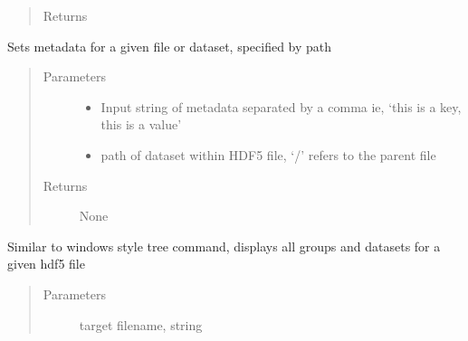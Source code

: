 \documentclass[letterpaper,10pt,english]{sphinxmanual}
\begin{document}
\begin{fulllineitems}
\begin{fulllineitems}
\begin{quote}
\begin{description}
\begin{itemize}
\end{itemize}

\item[{Returns}] \leavevmode
\sphinxAtStartPar


\end{description}\end{quote}

\end{fulllineitems}


\begin{fulllineitems}
\label{\detokenize{index:HDF5Browser.FileBrowser.__setMetadata}}
\sphinxAtStartPar
Sets metadata for a given file or dataset, specified by path
\begin{quote}\begin{description}
\item[{Parameters}] \leavevmode\begin{itemize}
\item {} 
\sphinxAtStartPar
{} \textendash{} Input string of metadata separated by a comma \sphinxhyphen{} ie, ‘this is a key, this is a value’

\item {} 
\sphinxAtStartPar
{} \textendash{} path of dataset within HDF5 file, ‘/’ refers to the parent file

\end{itemize}

\item[{Returns}] \leavevmode
\sphinxAtStartPar
None

\end{description}\end{quote}

\end{fulllineitems}


\begin{fulllineitems}
\label{\detokenize{index:HDF5Browser.FileBrowser.__tree}}
\sphinxAtStartPar
Similar to windows style tree command, displays all groups and datasets for a given hdf5 file
\begin{quote}\begin{description}
\item[{Parameters}] \leavevmode
\sphinxAtStartPar
{} \textendash{} target filename, string


\end{description}
\end{quote}
\end{fulllineitems}
\end{fulllineitems}
\end{document}
